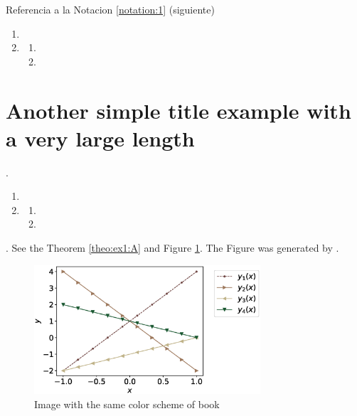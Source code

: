 Referencia a la Notacion \ref{notation:1} (siguiente)

\begin{notation}[Título C]
\label{notation:1}
\lipsum[1][1-2]
\begin{enumerate}
\item \lipsum[1][1-2]
\item \lipsum[1][1-2]
\begin{enumerate}
\item \lipsum[1][1-2]
\item \lipsum[1][1-2]
\end{enumerate}
\end{enumerate}
\end{notation}

\section{Another simple title example with a very large length}

\lipsum[1][1-3].
\begin{enumerate}
\item \lipsum[1][1-2]
\item \lipsum[1][1-2]
\begin{enumerate}
\item \lipsum[1][1-2]
\item \lipsum[1][1-2]
\end{enumerate}
\end{enumerate}
\lipsum[1][1-3]. See the Theorem \ref{theo:ex1:A} and Figure \ref{fig:exemplo}.
The Figure was generated by .

\begin{figure}[htbp] %
  \centering          %
  \includegraphics[width=0.75\textwidth]{chapters/cap1/python/example.eps}
  \caption{Image with the same color scheme of book} %
  \label{fig:exemplo} %
\end{figure}


